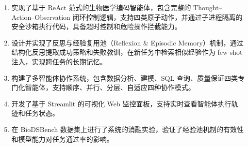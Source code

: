\begin{enumerate}
    \item 实现了基于 ReAct 范式的生物医学编码智能体，包含完整的 Thought--Action--Observation 闭环控制逻辑，支持四类原子动作，并通过子进程隔离的安全沙箱执行代码，具备超时控制和危险操作拦截能力。
    \item 设计并实现了反思与经验复用池（Reflexion \& Episodic Memory）机制，通过结构化反思提取成功策略和失败教训，在新任务中检索相似经验作为 few-shot 注入，实现跨任务的长期记忆。
    \item 构建了多智能体协作系统，包含数据分析、建模、SQL 查询、质量保证四类专门化智能体，支持顺序、并行、分层、自适应四种协作模式。
    \item 开发了基于 Streamlit 的可视化 Web 监控面板，支持实时查看智能体执行轨迹和任务状态。
    \item 在 BioDSBench\cite{wang2024biodsbench} 数据集上进行了系统的消融实验，验证了经验池机制的有效性和模型能力对任务通过率的影响。
\end{enumerate}

